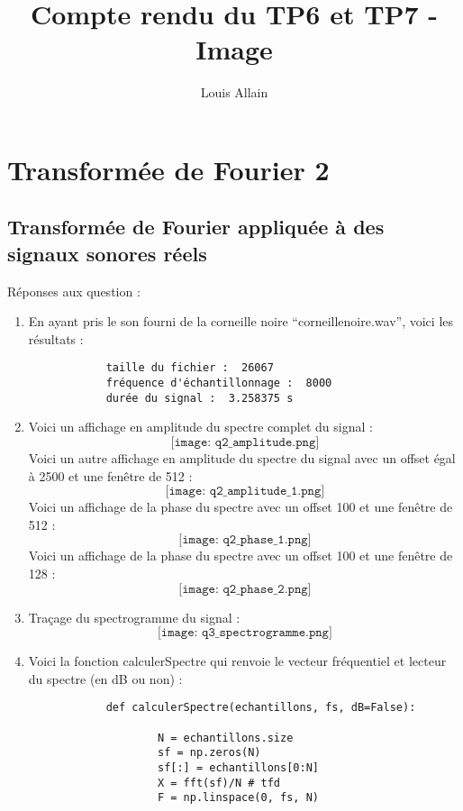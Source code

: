 \documentclass[12pt]{article}
\begin{document}
\title{Compte rendu du TP6 et TP7 - Image}
\author{Louis Allain}
\maketitle

\section{Transformée de Fourier 2}

\subsection{Transformée de Fourier appliquée à des signaux sonores réels}

Réponses aux question :
\begin{enumerate}
	\item 
		En ayant pris le son fourni de la corneille noire "`corneillenoire.wav"', voici les résultats :
		\begin{verbatim}
			taille du fichier :  26067
			fréquence d'échantillonnage :  8000
			durée du signal :  3.258375 s
		\end{verbatim}
		
	\item
		Voici un affichage en amplitude du spectre complet du signal : 
		$$
			\texttt{[image: q2\_amplitude.png]}
		$$
		Voici un autre affichage en amplitude du spectre du signal avec un offset égal à 2500 et une fenêtre de 512 :
		$$
			\texttt{[image: q2\_amplitude\_1.png]}
		$$
		Voici un affichage de la phase du spectre avec un offset 100 et une fenêtre de 512 :
		$$
			\texttt{[image: q2\_phase\_1.png]}
		$$
		Voici un affichage de la phase du spectre avec un offset 100 et une fenêtre de 128 :
		$$
			\texttt{[image: q2\_phase\_2.png]}
		$$
		
	\item
		Traçage du spectrogramme du signal :
		$$
			\texttt{[image: q3\_spectrogramme.png]}
		$$
		
	\item
		Voici la fonction calculerSpectre qui renvoie le vecteur fréquentiel et lecteur du spectre (en dB ou non) :
		\begin{verbatim}
			def calculerSpectre(echantillons, fs, dB=False):
    
					N = echantillons.size
					sf = np.zeros(N)
					sf[:] = echantillons[0:N]
					X = fft(sf)/N # tfd
					F = np.linspace(0, fs, N)
					

\end{verbatim}
\end{enumerate}
\end{document}
